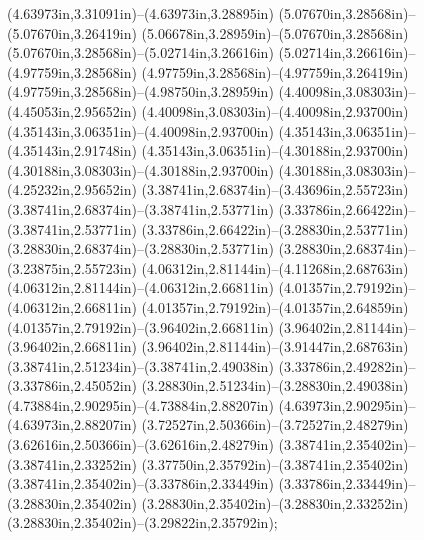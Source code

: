(4.63973in,3.31091in)--(4.63973in,3.28895in) (5.07670in,3.28568in)--(5.07670in,3.26419in) (5.06678in,3.28959in)--(5.07670in,3.28568in) (5.07670in,3.28568in)--(5.02714in,3.26616in) (5.02714in,3.26616in)--(4.97759in,3.28568in) (4.97759in,3.28568in)--(4.97759in,3.26419in) (4.97759in,3.28568in)--(4.98750in,3.28959in) (4.40098in,3.08303in)--(4.45053in,2.95652in) (4.40098in,3.08303in)--(4.40098in,2.93700in) (4.35143in,3.06351in)--(4.40098in,2.93700in) (4.35143in,3.06351in)--(4.35143in,2.91748in) (4.35143in,3.06351in)--(4.30188in,2.93700in) (4.30188in,3.08303in)--(4.30188in,2.93700in) (4.30188in,3.08303in)--(4.25232in,2.95652in) (3.38741in,2.68374in)--(3.43696in,2.55723in) (3.38741in,2.68374in)--(3.38741in,2.53771in) (3.33786in,2.66422in)--(3.38741in,2.53771in) (3.33786in,2.66422in)--(3.28830in,2.53771in) (3.28830in,2.68374in)--(3.28830in,2.53771in) (3.28830in,2.68374in)--(3.23875in,2.55723in) (4.06312in,2.81144in)--(4.11268in,2.68763in) (4.06312in,2.81144in)--(4.06312in,2.66811in) (4.01357in,2.79192in)--(4.06312in,2.66811in) (4.01357in,2.79192in)--(4.01357in,2.64859in) (4.01357in,2.79192in)--(3.96402in,2.66811in) (3.96402in,2.81144in)--(3.96402in,2.66811in) (3.96402in,2.81144in)--(3.91447in,2.68763in) (3.38741in,2.51234in)--(3.38741in,2.49038in) (3.33786in,2.49282in)--(3.33786in,2.45052in) (3.28830in,2.51234in)--(3.28830in,2.49038in) (4.73884in,2.90295in)--(4.73884in,2.88207in) (4.63973in,2.90295in)--(4.63973in,2.88207in) (3.72527in,2.50366in)--(3.72527in,2.48279in) (3.62616in,2.50366in)--(3.62616in,2.48279in) (3.38741in,2.35402in)--(3.38741in,2.33252in) (3.37750in,2.35792in)--(3.38741in,2.35402in) (3.38741in,2.35402in)--(3.33786in,2.33449in) (3.33786in,2.33449in)--(3.28830in,2.35402in) (3.28830in,2.35402in)--(3.28830in,2.33252in) (3.28830in,2.35402in)--(3.29822in,2.35792in);
